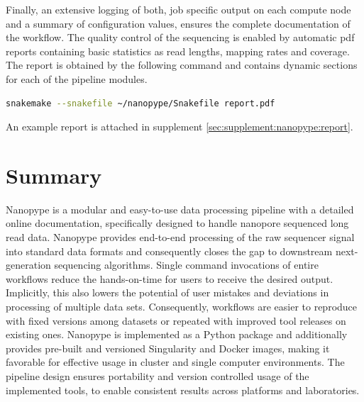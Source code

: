 Finally, an extensive logging of both, job specific output on each compute node and a summary of configuration values, ensures the complete documentation of the workflow. The quality control of the sequencing is enabled by automatic pdf reports containing basic statistics as read lengths, mapping rates and coverage. The report is obtained by the following command and contains dynamic sections for each of the pipeline modules.

\begin{lstlisting}[language=sh, caption=Nanopype report]
snakemake --snakefile ~/nanopype/Snakefile report.pdf
\end{lstlisting}

An example report is attached in supplement \ref{sec:supplement:nanopype:report}.




\section{Summary}
\label{sec:nanopype:summary}
Nanopype is a modular and easy-to-use data processing pipeline with a detailed online documentation, specifically designed to handle nanopore sequenced long read data.
Nanopype provides end-to-end processing of the raw sequencer signal into standard data formats and consequently closes the gap to downstream next-generation sequencing algorithms. Single command invocations of entire workflows reduce the hands-on-time for users to receive the desired output. Implicitly, this also lowers the potential of user mistakes and deviations in processing of multiple data sets. Consequently, workflows are easier to reproduce with fixed versions among datasets or repeated with improved tool releases on existing ones.
Nanopype is implemented as a Python package and additionally provides pre-built and versioned Singularity and Docker images, making it favorable for effective usage in cluster and single computer environments. The pipeline design ensures portability and version controlled usage of the implemented tools, to enable consistent results across platforms and laboratories.


